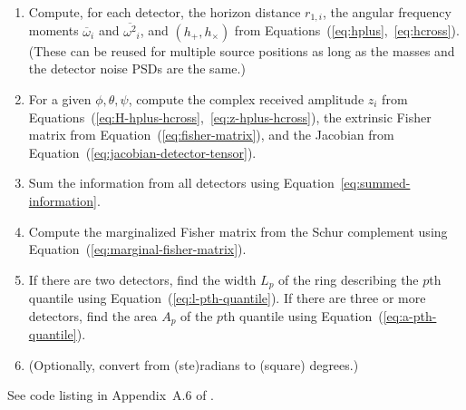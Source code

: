 \documentclass[amsmath,amssymb,aps,prx,reprint,nopreprintnumbers,nofootinbib,showpacs]{revtex4-1}
\begin{document}
\begin{enumerate}
    \item Compute, for each detector, the horizon distance $r_{1,i}$, the angular frequency moments ${\overline{\omega}}_i$ and ${\overline{\omega^2}}_i$, and $(h_+, h_\times)$ from Equations~(\ref{eq:hplus},~\ref{eq:hcross}). (These can be reused for multiple source positions as long as the masses and the detector noise \acp{PSD} are the same.)
    \item For a given $\phi, \theta, \psi$, compute the complex received amplitude $z_i$ from Equations~(\ref{eq:H-hplus-hcross},~\ref{eq:z-hplus-hcross}), the extrinsic Fisher matrix from Equation~(\ref{eq:fisher-matrix}), and the Jacobian from Equation~(\ref{eq:jacobian-detector-tensor}).
    \item Sum the information from all detectors using Equation~\ref{eq:summed-information}.
    \item Compute the marginalized Fisher matrix from the Schur complement using Equation~(\ref{eq:marginal-fisher-matrix}).
    \item If there are two detectors, find the width $L_p$ of the ring describing the $p$th quantile using Equation~(\ref{eq:l-pth-quantile}). If there are three or more detectors, find the area $A_p$ of the $p$th quantile using Equation~(\ref{eq:a-pth-quantile}).
    \item (Optionally, convert from (ste)radians to (square) degrees.)
\end{enumerate}

See code listing in Appendix~A.6 of \cite{leo-singer-thesis}.


\end{document}

